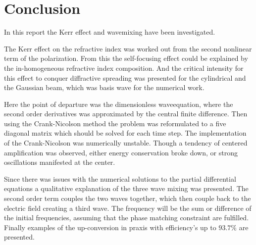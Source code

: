 \chapter{Conclusion}
\label{cha:conclusion}

In this report the Kerr effect and wavemixing have been investigated. 

The Kerr effect on the refractive index was worked out from the second nonlinear term of the
polarization. From this the self-focusing effect could be explained by the in-homogeneous
refractive index composition.  And the critical intensity for this effect to conquer diffractive
spreading was presented for the cylindrical and the Gaussian beam, which was basis wave for the
numerical work.

Here the point of departure was the dimensionless waveequation, where the second order derivatives
was approximated by the central finite difference. Then using the Crank-Nicolson method the
problem was reformulated to a five diagonal matrix which should be solved for each time
step. The implementation of the Crank-Nicolson was numerically unstable. Though a tendency of
centered amplification was observed, either energy conservation broke down, or strong oscillations
manifested at the center.


Since there was issues with the numerical solutions to the partial differential equations a
qualitative explanation of the three wave mixing was presented. The second order term couples the
two waves together, which then couple back to the electric field creating a third wave. The
frequency will be the sum or difference of the initial frequencies, assuming that the phase matching
constraint are fulfilled. Finally examples of the up-conversion in praxis with efficiency's up to
$93.7\%$ are presented.


